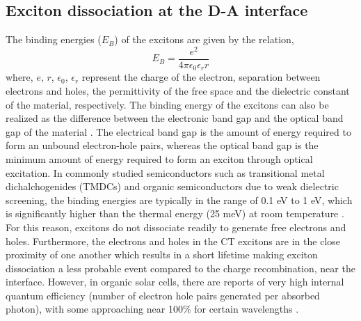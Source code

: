 \documentclass[12pt]{article}
\begin{document}
\subsection{Exciton dissociation at the D-A interface}
The binding energies ($E_B$) of the excitons are given by the relation,
\begin{equation}
    E_B = \frac{e^2}{4\pi\epsilon_0\epsilon_rr}
\end{equation}
where, $e$, $r$, $\epsilon_0$, $\epsilon_r$ represent the charge of the electron, separation between electrons and holes, the permittivity of the free space and the dielectric constant of the material, respectively. The binding energy of the excitons can also be realized as the difference between the electronic band gap and the optical band gap of the material \cite{ugeda2014giant}. The electrical band gap is the amount of energy required to form an unbound electron-hole pairs, whereas the optical band gap is the minimum amount of energy required to form an exciton through optical excitation. In commonly studied semiconductors such as transitional metal dichalchogenides (TMDCs) and organic semiconductors due to weak dielectric screening, the binding energies are typically in the range of 0.1 eV to 1 eV, which is significantly higher than the thermal energy (25 meV) at room temperature \cite{knupfer2003exciton,pospischil2016optoelectronic}. For this reason, excitons do not dissociate readily to generate free electrons and holes. Furthermore, the electrons and holes in the CT excitons are in the close proximity of one another which results in a short lifetime making exciton dissociation a less probable event compared to the charge recombination, near the interface. However, in organic solar cells, there are reports of very high internal quantum efficiency (number of electron hole pairs generated per absorbed photon), with some approaching near 100\% for certain wavelengths \cite{park2009bulk}.
\end{document}
